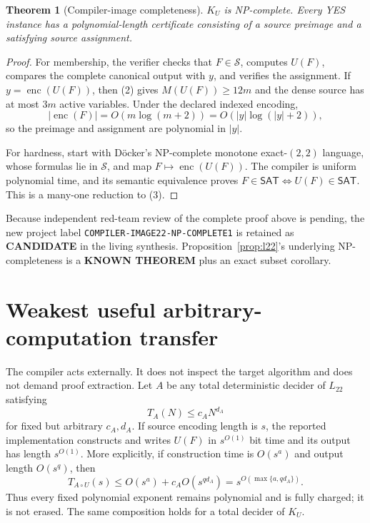 \documentclass[11pt]{article}
\newtheorem{theorem}{Theorem}
\newcommand{\SAT}{\mathsf{SAT}}
\newcommand{\Ltwo}{L_{22}}
\newcommand{\KNOWN}{\textbf{KNOWN THEOREM}}
\newcommand{\CAND}{\textbf{CANDIDATE}}
\begin{document}
\begin{theorem}[Compiler-image completeness]\label{thm:image}
$K_U$ is NP-complete.  Every YES instance has a polynomial-length certificate
consisting of a source preimage and a satisfying source assignment.
\end{theorem}
\begin{proof}
For membership, the verifier checks that $F\in\mathcal S$, computes $U(F)$,
compares the complete canonical output with $y$, and verifies the assignment.
If $y=\operatorname{enc}(U(F))$, then (2) gives $M(U(F))\ge12m$ and the dense
source has at most $3m$ active variables.  Under the declared indexed
encoding,
\[
 |\operatorname{enc}(F)|=O(m\log(m+2))
 =O(|y|\log(|y|+2)),                                      \tag{4}
\]
so the preimage and assignment are polynomial in $|y|$.

For hardness, start with D\"ocker's NP-complete monotone exact-$(2,2)$
language, whose formulas lie in $\mathcal S$, and map
$F\mapsto\operatorname{enc}(U(F))$.  The compiler is uniform polynomial time,
and its semantic equivalence proves
$F\in\SAT\Longleftrightarrow U(F)\in\SAT$.  This is a many-one reduction to
(3).
\end{proof}

Because independent red-team review of the complete proof above is pending,
the new project label \texttt{COMPILER-IMAGE22-NP-COMPLETE1} is retained as
\CAND{} in the living synthesis.  Proposition~\ref{prop:l22}'s underlying
NP-completeness is a \KNOWN{} plus an exact subset corollary.

\section{Weakest useful arbitrary-computation transfer}
The compiler acts externally.  It does not inspect the target algorithm and
does not demand proof extraction.  Let $A$ be any total deterministic decider
of $\Ltwo$ satisfying
\[
 T_A(N)\le c_A N^{d_A}                                   \tag{5}
\]
for fixed but arbitrary $c_A,d_A$.  If source encoding length is $s$, the
reported implementation constructs and writes $U(F)$ in $s^{O(1)}$ bit time
and its output has length $s^{O(1)}$.  More explicitly, if construction time
is $O(s^a)$ and output length $O(s^q)$, then
\[
 T_{A\circ U}(s)
 \le O(s^a)+c_A O(s^{q d_A})
 =s^{O(\max\{a,q d_A\})}.                                \tag{6}
\]
Thus every fixed polynomial exponent remains polynomial and is fully charged;
it is not erased.  The same composition holds for a total decider of $K_U$.
\end{document}
